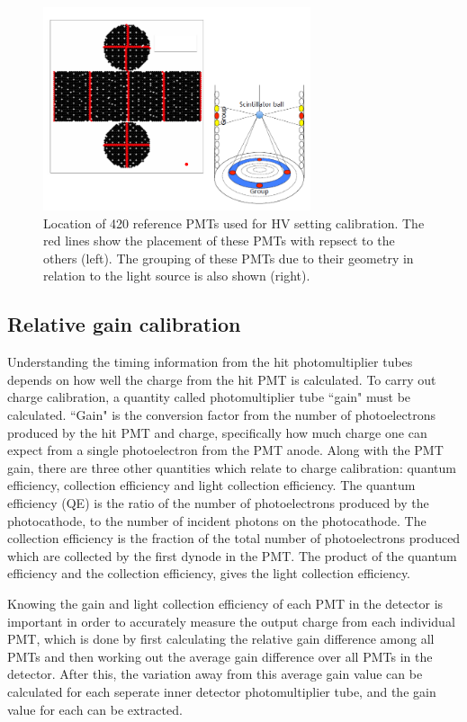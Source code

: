 \begin{figure}
    \centering
    \includegraphics[width=0.7\textwidth]{Figures/hvcalib.png}
\caption{Location of 420 reference PMTs used for HV setting calibration. The red lines show the placement of these PMTs with repsect to the others (left). The grouping of these PMTs due to their geometry in relation to the light source is also shown (right).}
    \label{fig:hvcalib}
\end{figure}




\subsection{Relative gain calibration}

Understanding the timing information from the hit photomultiplier tubes depends on how well the charge from the hit PMT is calculated. To carry out charge calibration, a quantity called photomultiplier tube ``gain" must be calculated. ``Gain" is the conversion factor from the number of photoelectrons produced by the hit PMT and charge, specifically how much charge one can expect from a single photoelectron from the PMT anode. Along with the PMT gain, there are three other quantities which relate to charge calibration: quantum efficiency, collection efficiency and light collection efficiency. 
\newline
The quantum efficiency (QE) is the ratio of the number of photoelectrons produced by the photocathode, to the number of incident photons on the photocathode. The collection efficiency is the fraction of the total number of photoelectrons produced which are collected by the first dynode in the PMT. The product of the quantum efficiency and the collection efficiency, gives the light collection efficiency.  

 Knowing the gain and light collection efficiency of each PMT in the detector is important in order to accurately measure the output charge from each individual PMT, which is done by first calculating the relative gain difference among all PMTs and then working out the average gain difference over all PMTs in the detector. After this, the variation away from this average gain value can be calculated for each seperate inner detector photomultiplier tube, and the gain value for each can be extracted. 

